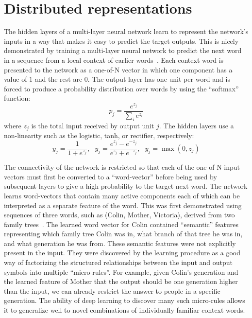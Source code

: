 \documentclass[10pts]{article}
\begin{document}
\section{Distributed representations}

The hidden layers of a multi-layer neural network learn to represent the
network's inputs in a way that makes it easy to predict the target
outputs. This is nicely demonstrated by training a multi-layer neural
network to predict the next word in a sequence from a local context of
earlier words~\citep{BenDucVin01-short}. 
Each context word is presented to the network as a one-of-N
vector in which one component has a value of $1$ and the rest are $0$. The
output layer has one unit per word and is forced to produce a probability
distribution over words by using the ``softmax'' function:
\begin{equation}
p_j = \frac{e^{z_j}}{\sum_i e^{z_i}}
\end{equation}
where $z_j$ is the total input received by output unit $j$. The hidden
layers use a non-linearity such as the logistic, tanh, or rectifier, respectively:
\begin{equation}
y_j = \frac{1}{1+ e^{z_j}}, \ \ \ y_j = \frac{e^{z_j}-e^{-z_j}}{e^{z_j}+e^{-z_j}}, \ \ \
 y_j = \max(0, z_j)
\end{equation}

The connectivity of the network is restricted so that each of the one-of-N
input vectors must first be converted to a ``word-vector'' before being
used by subsequent layers to give a high probability to the target next
word.  The network learns word-vectors that contain many active components
each of which can be interpreted as a separate feature of the word. This
was first demonstrated using sequences of three words, such as
(Colin, Mother, Victoria), derived from two family trees~\citep{RHW}. The learned word
vector for Colin contained ``semantic'' features representing which family
tree Colin was in, what branch of that tree he was in, and what generation
he was from. 
These semantic features were not explicitly present
in the input.  They were discovered by the learning procedure as a good way
of factorizing the structured relationships between the input and output
symbols into multiple ``micro-rules''.  For example, given Colin's
generation and the learned feature of Mother that the output should be one
generation higher than the input, we can already restrict the answer to
people in a specific generation. The ability of deep learning to discover
many such micro-rules allows it to generalize well to novel combinations of
individually familiar context words.
\end{document}
